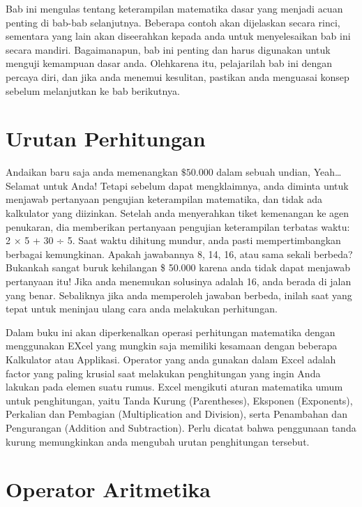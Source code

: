 \documentclass[
]{book}
\begin{document}
Bab ini mengulas tentang keterampilan matematika dasar yang menjadi acuan penting di bab-bab selanjutnya. Beberapa contoh akan dijelaskan secara rinci, sementara yang lain akan diseerahkan kepada anda untuk menyelesaikan bab ini secara mandiri. Bagaimanapun, bab ini penting dan harus digunakan untuk menguji kemampuan dasar anda. Olehkarena itu, pelajarilah bab ini dengan percaya diri, dan jika anda menemui kesulitan, pastikan anda menguasai konsep sebelum melanjutkan ke bab berikutnya.

\hypertarget{urutan-perhitungan}{%
\section{Urutan Perhitungan}\label{urutan-perhitungan}}

Andaikan baru saja anda memenangkan \(\$ 50.000\) dalam sebuah undian, Yeah\ldots{} Selamat untuk Anda! Tetapi sebelum dapat mengklaimnya, anda diminta untuk menjawab pertanyaan pengujian keterampilan matematika, dan tidak ada kalkulator yang diizinkan. Setelah anda menyerahkan tiket kemenangan ke agen penukaran, dia memberikan pertanyaan pengujian keterampilan terbatas waktu: 2 × 5 + 30 ÷ 5. Saat waktu dihitung mundur, anda pasti mempertimbangkan berbagai kemungkinan. Apakah jawabannya 8, 14, 16, atau sama sekali berbeda? Bukankah sangat buruk kehilangan \$ 50.000 karena anda tidak dapat menjawab pertanyaan itu! Jika anda menemukan solusinya adalah 16, anda berada di jalan yang benar. Sebaliknya jika anda memperoleh jawaban berbeda, inilah saat yang tepat untuk meninjau ulang cara anda melakukan perhitungan.

Dalam buku ini akan diperkenalkan operasi perhitungan matematika dengan menggunakan EXcel yang mungkin saja memiliki kesamaan dengan beberapa Kalkulator atau Applikasi. Operator yang anda gunakan dalam Excel adalah factor yang paling krusial saat melakukan penghitungan yang ingin Anda lakukan pada elemen suatu rumus. Excel mengikuti aturan matematika umum untuk penghitungan, yaitu Tanda Kurung (Parentheses), Eksponen (Exponents), Perkalian dan Pembagian (Multiplication and Division), serta Penambahan dan Pengurangan (Addition and Subtraction). Perlu dicatat bahwa penggunaan tanda kurung memungkinkan anda mengubah urutan penghitungan tersebut.

\hypertarget{operator-aritmetika}{%
\section{Operator Aritmetika}\label{operator-aritmetika}}
\end{document}
